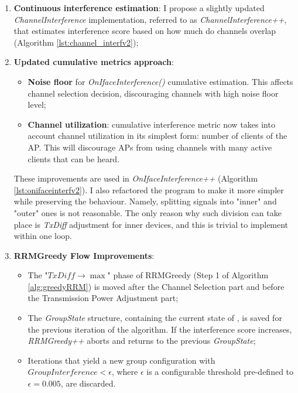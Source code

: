 \begin{enumerate}
    \item \textbf{Continuous interference estimation}: I propose a slightly updated \textit{ChannelInterference} implementation, referred to as \textit{ChannelInterference++}, that estimates interference score based on how much do channels overlap (Algorithm \ref{lst:channel_interfv2});
    \item \textbf{Updated cumulative metrics approach}:
        \begin{itemize}
            \item \textbf{Noise floor} for \textit{OnIfaceInterference()} cumulative estimation. This affects channel selection decision, discouraging channels with high noise floor level;
            \item \textbf{Channel utilization}: cumulative interference metric now takes into account channel utilization in its simplest form: number of clients of the AP. This will discourage APs from using channels with many active clients that can be heard.
        \end{itemize}
        These improvements are used in \textit{OnIfaceInterference++} (Algorithm \ref{lst:onifaceinterfv2}). I also refactored the program to make it more simpler while preserving the behaviour. Namely, splitting signals into "inner" and "outer" ones is not reasonable. The only reason why such division can take place is \textit{TxDiff} adjustment for inner devices, and this is trivial to implement within one loop.
    \item \textbf{RRMGreedy Flow Improvements}:
        \begin{itemize}
            \item The "$TxDiff \rightarrow \max$" phase of RRMGreedy (Step 1 of Algorithm \ref{alg:greedyRRM}) is moved after the Channel Selection part and before the Transmission Power Adjustment part;
            \item The \textit{GroupState} structure, containing the current state of \rrmG, is saved for the previous iteration of the algorithm. If the interference score increases, \textit{RRMGreedy++} aborts and returns to the previous \textit{GroupState};
            \item Iterations that yield a new group configuration with $GroupInterference < \epsilon$, where $\epsilon$ is a configurable threshold pre-defined to $\epsilon = 0.005$, are discarded.
        \end{itemize}
\end{enumerate}

